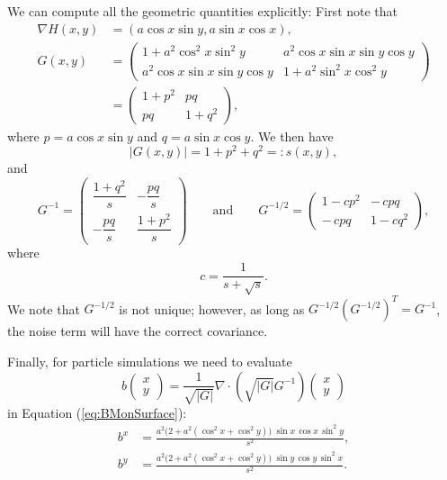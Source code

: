 \documentclass[11pt, a4paper]{article}
\newcommand{\cdummy}{\cdot}
\newcommand{\NP}[1]{{\color{blue}N: #1}}
\begin{document}
We can compute all the geometric quantities explicitly: First note that
\begin{align*}
    \nabla H(x,y) &= (a \cos x \sin y, a \sin x \cos x), \\
    G(x,y)
     &= \begin{pmatrix}
   1 + a^2 \cos^2 x \sin^2 y & a^2 \cos x \sin x \sin y \cos y\\[1ex]
   a^2 \cos x \sin x \sin y \cos y & 1 + a^2 \sin^2 x \cos^2 y
   \end{pmatrix}\\
    &= \begin{pmatrix}
   1+p^2 & pq \\[1ex]
   pq & 1+q^2
   \end{pmatrix},
\end{align*}
where %
$p = a \cos x \sin y$ and $q=a\sin x \cos y$.
We then have
\[
|G(x,y)| = 1+p^2+q^2 =: s(x,y),
\]
and
\[
G^{-1} = 
\begin{pmatrix}
  \dfrac{1+q^2}{s} & -\dfrac{pq}{s}\\[2ex]
   -\dfrac{pq}{s} & \dfrac{1+p^2}{s}
   \end{pmatrix}
   \qquad \mathrm{and} \qquad G^{-1/2} = \begin{pmatrix}
   1-c p^2 & -\,c pq\\[4pt]
-\,c pq & 1-c q^2
   \end{pmatrix},
\]
where 
\[
c = \frac{1}{s + \sqrt{s}}.
\]
We note that $G^{-1/2}$ is not unique; however, as long as $G^{-1/2}(G^{-1/2})^T = G^{-1}$, the noise term will have the correct covariance.

Finally, for particle simulations we need to evaluate
\[
b\begin{pmatrix}
      x \\ y 
   \end{pmatrix} = \frac{1}{\sqrt{| G |}} \nabla \cdummy \left(
   \sqrt{| G |} G^{- 1} \right) \begin{pmatrix}
      x \\ y 
   \end{pmatrix}
\]
in Equation (\ref{eq:BMonSurface}):
\begin{align}
b^x
 &= \frac{a^2\big(2+a^2(\cos^2x+\cos^2y)\big)\; \sin x \, \cos x \,\sin^2 y}
        {s^2}, \\[2ex]
b^y
 &= \frac{a^2\big(2+a^2(\cos^2x+\cos^2y)\big)\; \sin y \, \cos y \,\sin^2 x}
        {s^2} .
\end{align}
\end{document}
